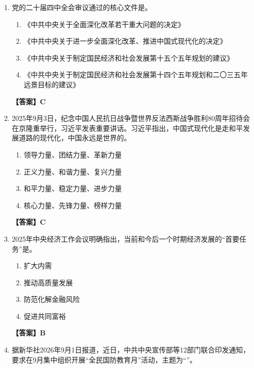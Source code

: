 \documentclass[UTF8,11pt,a4paper]{ctexart}
\begin{document}
\begin{enumerate}[label=\textbf{\arabic*.}, leftmargin=2.5em, itemsep=0.7em]
\begin{enumerate}[label=\Alph*., leftmargin=2em, itemsep=0.1em, topsep=0.15em]
\item 《中国革命和中国共产党》
\item 《星星之火，可以燎原》
\end{enumerate}
\textbf{【答案】A}
\item 党的二十届四中全会审议通过的核心文件是\allowbreak\underline{\hspace{4em}}。
\begin{enumerate}[label=\Alph*., leftmargin=2em, itemsep=0.1em, topsep=0.15em]
\item 《中共中央关于全面深化改革若干重大问题的决定》
\item 《中共中央关于进一步全面深化改革、推进中国式现代化的决定》
\item 《中共中央关于制定国民经济和社会发展第十五个五年规划的建议》
\item 《中共中央关于制定国民经济和社会发展第十四个五年规划和二〇三五年远景目标的建议》
\end{enumerate}
\textbf{【答案】C}
\item 2025年9月3日，纪念中国人民抗日战争暨世界反法西斯战争胜利80周年招待会在京隆重举行，习近平发表重要讲话。习近平指出，中国式现代化是走和平发展道路的现代化，中国永远是世界的\allowbreak\underline{\hspace{4em}}。
\begin{enumerate}[label=\Alph*., leftmargin=2em, itemsep=0.1em, topsep=0.15em]
\item 领导力量、团结力量、革新力量
\item 正义力量、和谐力量、复兴力量
\item 和平力量、稳定力量、进步力量
\item 核心力量、先锋力量、榜样力量
\end{enumerate}
\textbf{【答案】C}
\item 2025年中央经济工作会议明确指出，当前和今后一个时期经济发展的“首要任务”是\allowbreak\underline{\hspace{4em}}。
\begin{enumerate}[label=\Alph*., leftmargin=2em, itemsep=0.1em, topsep=0.15em]
\item 扩大内需
\item 推动高质量发展
\item 防范化解金融风险
\item 促进共同富裕
\end{enumerate}
\textbf{【答案】B}
\item 据新华社2026年9月1日报道，近日，中共中央宣传部等12部门联合印发通知，要求在9月集中组织开展“全民国防教育月”活动，主题为“\allowbreak\underline{\hspace{4em}}”。

\end{enumerate}
\end{document}
